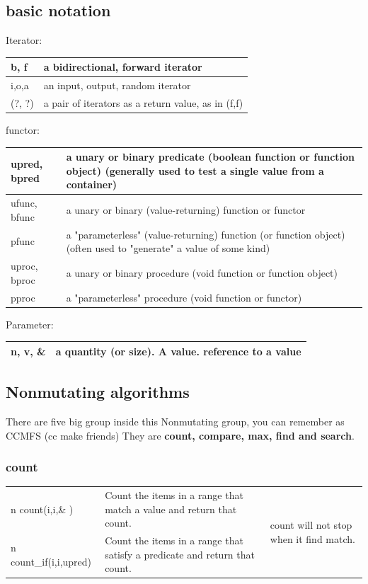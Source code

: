 \documentclass[a4paper,11pt,twoside]{book}
\def\pdfbook{}
\newcommand{\tophline}{\hline }
\newcommand{\bottomhline}{\\ \hline }
\newcommand{\tophline}{ }
\newcommand{\bottomhline}{ }
\begin{document}
\subsection{basic notation}

Iterator:  \\
\begin{tabular}{| p{} |p{}|}
\tophline b, f &	a bidirectional, forward iterator \\
\tophline i,o,a 	&an input, output, random iterator  \\
\tophline(?, ?)	&a pair of iterators as a return value, as in (f,f) \bottomhline
\end{tabular}

functor:  \\
\begin{tabular}{| p{} |p{}|}
\tophline upred, bpred	& a unary or binary predicate (boolean function or function object)
(generally used to test a single value from a container) \\

\tophline ufunc, bfunc	&  a unary or binary  (value-returning) function or functor \\
\tophline pfunc	& a "parameterless" (value-returning) function (or function object)
(often used to "generate" a value of some kind) \\
\tophline uproc, bproc	& a unary or binary  procedure (void function or function object) \\
\tophline pproc	&  a "parameterless" procedure (void function or functor) \bottomhline
\end{tabular}

Parameter:  \\
\begin{tabular}{| p{} |p{}|}
\tophline n, v, \&  & 	a quantity (or size). A value. reference to a value \bottomhline
\end{tabular}

\subsection{Nonmutating algorithms}
There are five big group inside this Nonmutating group, you can remember as CCMFS (cc make friends) They are \textbf{count, compare, max, find and search}.


\subsubsection{count}
\begin{tabular}{| p{} |p{}|p{}|}
\tophline n count(i,i,\& ) & Count the items in a range that match a value and return that count.& \multirow{2}{*}{ \parbox{0.2\textwidth}{count will not stop when it find match. } }    \\
\ifdefined\pdfbook  \cline{1-2} \fi n count\_if(i,i,upred)  & Count the items in a range that satisfy a predicate and return that count. & \bottomhline
\end{tabular}
\end{document}
